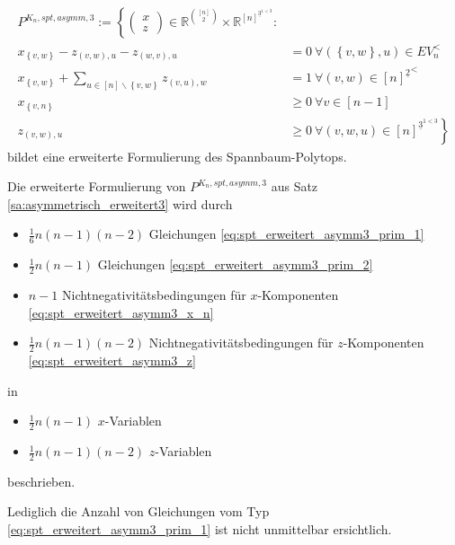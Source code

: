 \documentclass[10p,a4paper,BCOR = 12mm, DIV=15]{scrbook}
\begin{document}
{\begin{Sa}
\label{sa:asymmetrisch_erweitert3}
\begin{align}
P^{K_n, spt, asymm, 3} := \left\{
\left(\begin{array}{c}
x \\
z
\end{array}\right)\in \mathbb{R}^{[n]\choose 2}\times \mathbb{R}^{\left[n\right]^{\underline{3}^{1<3}}}: \nonumber\right. \\
x_{\left\{v, w\right\}} - z_{\left(v, w\right), u} - z_{\left(w, v\right), u} & = 0\ \forall \left(\left\{v, w\right\}, u\right)\in EV_n^< \label{eq:spt_erweitert_asymm3_prim_1} \\
x_{\left\{v, w\right\}} + \sum_{u\in[n]\backslash\left\{v, w\right\}} z_{\left(v, u\right), w} & = 1\ \forall \left(v, w\right)\in {[n]^{\underline{2}}}^< \label{eq:spt_erweitert_asymm3_prim_2} \\
x_{\left\{v, n\right\}} & \geq 0 \ \forall v\in \left[n-1\right] \label{eq:spt_erweitert_asymm3_x_n} \\
z_{\left(v, w\right), u} & \left. \geq 0 \ \forall \left(v, w, u\right)\in \left[n\right]^{\underline{3}^{1<3}} \label{eq:spt_erweitert_asymm3_z} \right\}
\end{align}
bildet eine erweiterte Formulierung des Spannbaum-Polytops.
\end{Sa}

\begin{Bem}
Die erweiterte Formulierung von $P^{K_n, spt, asymm, 3}$ aus Satz \ref{sa:asymmetrisch_erweitert3} wird durch
\begin{itemize}
\item $\frac{1}{6} n \left(n-1\right) \left(n-2\right)$ Gleichungen \eqref{eq:spt_erweitert_asymm3_prim_1}
\item $\frac{1}{2} n \left(n-1\right)$ Gleichungen \eqref{eq:spt_erweitert_asymm3_prim_2}
\item $n-1$ Nichtnegativitätsbedingungen für $x$-Komponenten \eqref{eq:spt_erweitert_asymm3_x_n}
\item $\frac{1}{2} n \left(n-1\right) \left(n-2\right)$ Nichtnegativitätsbedingungen für $z$-Komponenten \eqref{eq:spt_erweitert_asymm3_z}
\end{itemize}
in 
\begin{itemize}
\item $\frac{1}{2} n \left(n-1\right)$ $x$-Variablen
\item $\frac{1}{2} n \left(n-1\right) \left(n-2\right)$ $z$-Variablen
\end{itemize}
beschrieben.
\end{Bem}
\begin{bew}
Lediglich die Anzahl von Gleichungen vom Typ \eqref{eq:spt_erweitert_asymm3_prim_1} ist nicht unmittelbar ersichtlich.


\end{bew}}
\end{document}
